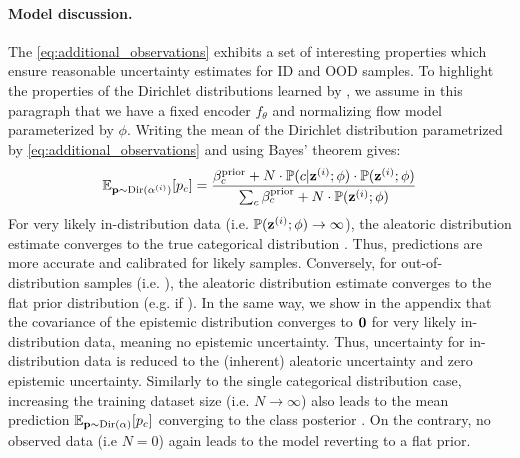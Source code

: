 \paragraph{Model discussion.} The \cref{eq:additional_observations} exhibits a set of interesting properties which ensure reasonable uncertainty estimates for ID and OOD samples. To highlight the properties of the Dirichlet distributions learned by \PostNetacro, we assume in this paragraph that we have a fixed encoder $f_\theta$ and normalizing flow model parameterized by $\phi$. Writing the mean of the Dirichlet distribution parametrized by \cref{eq:additional_observations} and using Bayes' theorem gives:
\begin{equation}
\mathbb{E}_{\mathbf{p}\sim \mathrm{Dir}(\mathbf{\alpha}^{(i)})}[p_c] = \frac{\beta_c^\text{prior} + N \cdot \mathbb{P}(c | \bold{z}^{(i)}; \phi) \cdot \mathbb{P}(\bold{z}^{(i)}; \phi)}{\sum_c\beta_c^\text{prior} + N \cdot \mathbb{P}(\bold{z}^{(i)}; \phi)}
\end{equation}
For very likely in-distribution data (i.e. $\mathbb{P}(\bold{z}^{(i)} ; \phi) \rightarrow \infty$), the aleatoric distribution estimate  converges to the true categorical distribution \smash{$\prob(\iclass|\latent \dataix; \phi)$}. Thus, predictions are more accurate and calibrated for likely samples. Conversely, for out-of-distribution samples (i.e. ), the aleatoric distribution estimate  converges to the flat prior distribution (e.g.  if ). In the same way, we show in the appendix that the covariance of the epistemic distribution converges to $\mathbf{0}$ for very likely in-distribution data, meaning no epistemic uncertainty. Thus, uncertainty for in-distribution data is reduced to the (inherent) aleatoric uncertainty and zero epistemic uncertainty.
%
Similarly to the single categorical distribution case, increasing the training dataset size (i.e. $N \rightarrow \infty$) also leads to the mean prediction $\mathbb{E}_{\mathbf{p}\sim \mathrm{Dir}(\mathbf{\alpha})}[p_c]$ converging to the class posterior . On the contrary, no observed data (i.e $N=0$) again leads to the model reverting to a flat prior.

